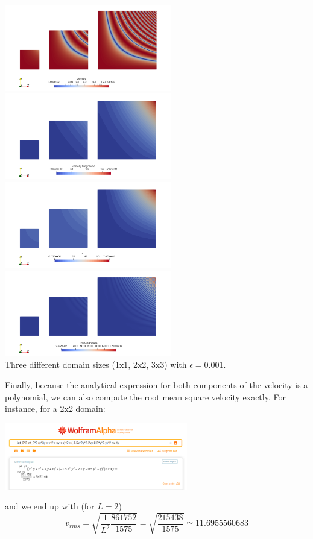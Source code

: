 \begin{center}
\includegraphics[width=7.28cm]{images/mms/mms7_visc}
\includegraphics[width=7.28cm]{images/mms/mms7_vel}\\
\includegraphics[width=7.28cm]{images/mms/mms7_press}
\includegraphics[width=7.28cm]{images/mms/mms7_rhs}\\
Three different domain sizes (1x1, 2x2, 3x3) with $\epsilon=0.001$.
\end{center}


Finally, because the analytical expression for both components of the velocity is a polynomial, we can also
compute the root mean square velocity exactly. For instance, for a 2x2 domain:
\begin{center}
\includegraphics[width=8cm]{images/mms/mms7_vrmstheo}
\end{center}
and we end up with (for $L=2$)
\[
v_{rms} = \sqrt{\frac{1}{L^2}\frac{861752}{1575}} = \sqrt{\frac{215438}{1575}}
\simeq 11.6955560683
\]

